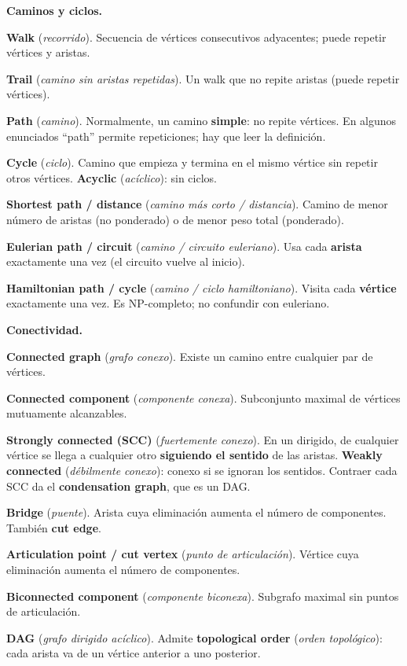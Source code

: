 \textbf{Caminos y ciclos.}
\begin{props}
  \item \textbf{Walk} (\textit{recorrido}). Secuencia de vértices consecutivos adyacentes; puede repetir vértices y aristas.
  \item \textbf{Trail} (\textit{camino sin aristas repetidas}). Un walk que no repite aristas (puede repetir vértices).
  \item \textbf{Path} (\textit{camino}). Normalmente, un camino \textbf{simple}: no repite vértices. En algunos enunciados ``path'' permite repeticiones; hay que leer la definición.
  \item \textbf{Cycle} (\textit{ciclo}). Camino que empieza y termina en el mismo vértice sin repetir otros vértices. \textbf{Acyclic} (\textit{acíclico}): sin ciclos.
  \item \textbf{Shortest path / distance} (\textit{camino más corto / distancia}). Camino de menor número de aristas (no ponderado) o de menor peso total (ponderado).
  \item \textbf{Eulerian path / circuit} (\textit{camino / circuito euleriano}). Usa cada \textbf{arista} exactamente una vez (el circuito vuelve al inicio).
  \item \textbf{Hamiltonian path / cycle} (\textit{camino / ciclo hamiltoniano}). Visita cada \textbf{vértice} exactamente una vez. Es NP-completo; no confundir con euleriano.
\end{props}

\textbf{Conectividad.}
\begin{props}
  \item \textbf{Connected graph} (\textit{grafo conexo}). Existe un camino entre cualquier par de vértices.
  \item \textbf{Connected component} (\textit{componente conexa}). Subconjunto maximal de vértices mutuamente alcanzables.
  \item \textbf{Strongly connected (SCC)} (\textit{fuertemente conexo}). En un dirigido, de cualquier vértice se llega a cualquier otro \textbf{siguiendo el sentido} de las aristas. \textbf{Weakly connected} (\textit{débilmente conexo}): conexo si se ignoran los sentidos. Contraer cada SCC da el \textbf{condensation graph}, que es un DAG.
  \item \textbf{Bridge} (\textit{puente}). Arista cuya eliminación aumenta el número de componentes. También \textbf{cut edge}.
  \item \textbf{Articulation point / cut vertex} (\textit{punto de articulación}). Vértice cuya eliminación aumenta el número de componentes.
  \item \textbf{Biconnected component} (\textit{componente biconexa}). Subgrafo maximal sin puntos de articulación.
  \item \textbf{DAG} (\textit{grafo dirigido acíclico}). Admite \textbf{topological order} (\textit{orden topológico}): cada arista va de un vértice anterior a uno posterior.
\end{props}

